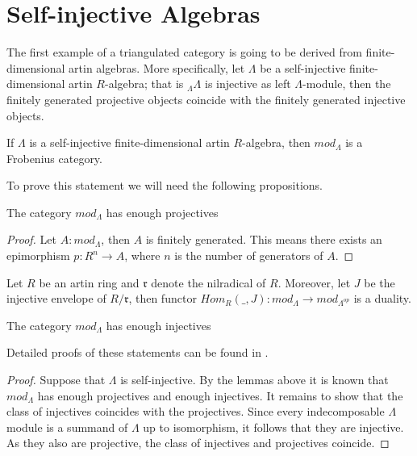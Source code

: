 \section{Self-injective Algebras}

    The first example of a triangulated category is going to be derived from finite-dimensional artin algebras. More specifically, let $\Lambda$ be a self-injective finite-dimensional artin $R$-algebra; that is $_{\Lambda}\Lambda$ is injective as left $\Lambda$-module, then the finitely generated projective objects coincide with the finitely generated injective objects.

    \begin{prop}
        If $\Lambda$ is a self-injective finite-dimensional artin $R$-algebra, then $mod_{\Lambda}$ is a Frobenius category.
    \end{prop}

    To prove this statement we will need the following propositions.

    \begin{lemma}
        The category $mod_{\Lambda}$ has enough projectives
    \end{lemma}

    \begin{proof}
        Let $A:mod_{\Lambda}$, then $A$ is finitely generated. This means there exists an epimorphism $p:R^n\rightarrow A$, where $n$ is the number of generators of $A$.
    \end{proof}

    \begin{lemma}
        Let $R$ be an artin ring and $\mathfrak{r}$ denote the nilradical of $R$. Moreover, let $J$ be the injective envelope of $R/\mathfrak{r}$, then functor $Hom_R(\_,J):mod_{\Lambda}\rightarrow mod_{\Lambda^{op}}$ is a duality.
    \end{lemma}

    \begin{corollary}
        The category $mod_{\Lambda}$ has enough injectives
    \end{corollary}

    Detailed proofs of these statements can be found in \cite{Rei95}.

    \begin{proof}
        Suppose that $\Lambda$ is self-injective. By the lemmas above it is known that $mod_{\Lambda}$ has enough projectives and enough injectives. It remains to show that the class of injectives coincides with the projectives. Since every indecomposable $\Lambda$ module is a summand of $\Lambda$ up to isomorphism, it follows that they are injective. As they also are projective, the class of injectives and projectives coincide.
    \end{proof}

